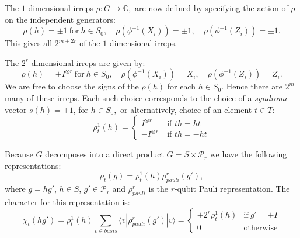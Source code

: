 \documentclass[a4paper,onecolumn,11pt,unpublished]{quantumarticle}
\def\Complex{\mathbb{C}}
\def\Pauli{\mathcal{P}}
\def\Stab{S}
\begin{document}
The $1$-dimensional irreps $\rho:G\to \Complex,$
are now defined by
specifying the action of $\rho$ on the independent generators:
$$
    \rho(h)=\pm 1\ \mbox{for}\ h\in \Stab_0,
    \quad \rho(\phi^{-1}(X_i)) = \pm 1,\quad \rho(\phi^{-1}(Z_i)) = \pm 1.
$$
This gives all $2^{m+2r}$ of the $1$-dimensional irreps.

The $2^r$-dimensional irreps are given by:
$$
    \rho(h) = \pm I^{\otimes r}\ \mbox{for}\ h\in \Stab_0,
    \quad \rho(\phi^{-1}(X_i)) = X_i,\quad \rho(\phi^{-1}(Z_i)) = Z_i.
$$
We are free to choose the signs of the $\rho(h)$ for each $h\in \Stab_0.$
Hence there are $2^m$ many of these irreps.
Each such choice corresponds to the choice of a {\it syndrome} vector $s(h)=\pm 1$, for $h \in \Stab_0,$
or alternatively, choice of an element $t\in T:$
$$
    \rho^1_t(h) = \left\{ \begin{array}{ll}
 I^{\otimes r}\ &\mbox{if $th=ht$}\\
 -I^{\otimes r}\ &\mbox{if $th=-ht$}\end{array} \right. %
$$


Because $G$ decomposes 
into a direct product $G=\Stab\times \Pauli_r$ we have the
following representations:
$$
    \rho_t(g) = \rho^1_t(h) \rho^r_{pauli}(g'),
$$
where $g=hg'$, $h\in \Stab$, $g'\in \Pauli_r$ 
and $\rho^r_{pauli}$ is the $r$-qubit Pauli representation.
The character for this representation is:
$$
\chi_{t}(hg') = \rho_t^1(h) \sum_{v \in basis} \langle v | \rho^r_{{pauli}}(g') | v \rangle
    = \left\{ \begin{array}{ll}
 \pm 2^r\rho_t^1(h) &\mbox{if}\ g'=\pm I\\
 0 &\mbox{otherwise}\end{array}\right.
$$
\end{document}
